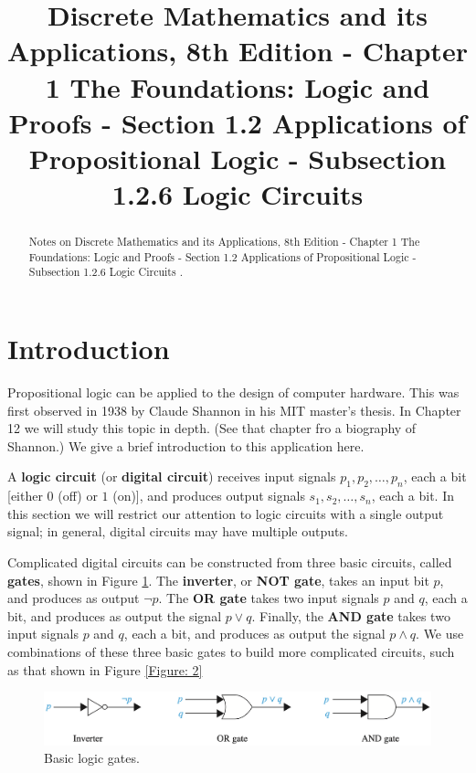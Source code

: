 \documentclass{Axon}
\title{Discrete Mathematics and its Applications, 8th Edition - Chapter 1 The Foundations: Logic and Proofs - Section 1.2 Applications of Propositional Logic - Subsection 1.2.6 Logic Circuits}
\begin{document}
\maketitle
\makeauthor
\begin{abstract}
Notes on Discrete Mathematics and its Applications, 8th Edition - Chapter 1 The Foundations: Logic and Proofs - Section 1.2 Applications of Propositional Logic - Subsection 1.2.6 Logic Circuits \cite{Rosen}.
\end{abstract}
\section{Introduction}
Propositional logic can be applied to the design of computer hardware. This was first observed in 1938 by Claude Shannon in his MIT master's thesis. In Chapter 12 we will study this topic in depth. (See that chapter fro a biography of Shannon.) We give a brief introduction to this application here.

A \textbf{logic circuit} (or \textbf{digital circuit}) receives input signals \(p_1, p_2, \ldots, p_n\), each a bit [either \(0\) (off) or \(1\) (on)], and produces output signals \(s_1, s_2, \ldots, s_n\), each a bit. In this section we will restrict our attention to logic circuits with a single output signal; in general, digital circuits may have multiple outputs.

Complicated digital circuits can be constructed from three basic circuits, called \textbf{gates}, shown in Figure \ref{Figure: 1}. The \textbf{inverter}, or \textbf{NOT gate}, takes an input bit \(p\), and produces as output \(\lnot p\). The \textbf{OR gate} takes two input signals \(p\) and \(q\), each a bit, and produces as output the signal \(p \lor q\). Finally, the \textbf{AND gate} takes two input signals \(p\) and \(q\), each a bit, and produces as output the signal \(p \land q\). We use combinations of these three basic gates to build more complicated circuits, such as that shown in Figure \ref{Figure: 2}

\begin{figure}[h]
    \centering
    \includegraphics[width=0.75\linewidth]{Discrete Mathematics and its Applications, 8th Edition/Chapter 1 Logic and Proofs/Section 1.2 Applications of Propositional Logic/Figure 1.png}
    \caption{Basic logic gates.}
    \label{Figure: 1}
\end{figure}
\end{document}
